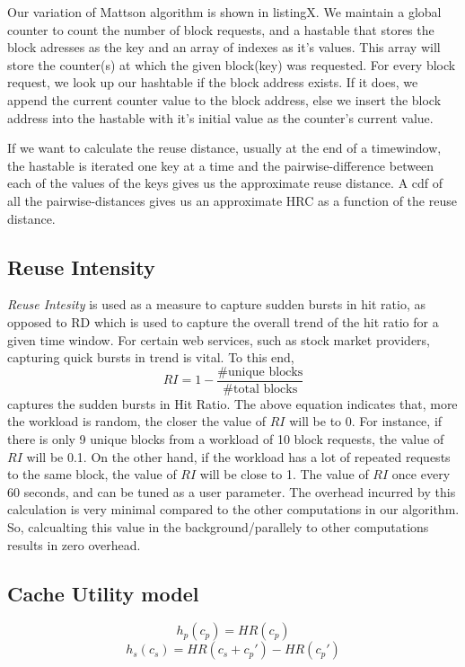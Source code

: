  Our variation of Mattson algorithm is shown in listingX. We maintain a global counter to count the number of block requests, and a hastable that stores the block adresses as the key and an array of indexes as it's values. This array will store the counter(s) at which the given block(key) was requested. For every block request, we look up our hashtable if the block address exists. If it does, we append the current counter value to the block address, else we insert the block address into the hastable with it's initial value as the counter's current value.

 If we want to calculate the reuse distance, usually at the end of a timewindow, the hastable is iterated one key at a time and the pairwise-difference between each of the values of the keys gives us the approximate reuse distance. A cdf of all the pairwise-distances gives us an approximate HRC as a function of the reuse distance. 

 \subsection{Reuse Intensity}

\emph{Reuse Intesity} is used as a measure to capture sudden bursts in hit ratio, as opposed to RD which is used to capture the overall trend of the hit ratio for a given time window. For certain web services, such as stock market providers, capturing quick bursts in trend is vital. To this end, $$ RI = 1 - \frac{\text{\# unique blocks}}{\text{\# total blocks}} $$ captures the sudden bursts in Hit Ratio. The above equation indicates that, more the workload is random, the closer the value of $RI$ will be to 0. For instance, if there is only 9 unique blocks from a workload of 10 block requests, the value of $RI$ will be 0.1. On the other hand, if the workload has a lot of repeated requests to the same block, the value of $RI$ will be close to 1. The value of $RI$ once every 60 seconds, and can be tuned as a user parameter. The overhead incurred by this calculation is very minimal compared to the other computations in our algorithm. So, calcualting this value in the background/parallely to other computations results in zero overhead. 

\subsection{Cache Utility model}


$$ h_p(c_p)  = HR(c_p) $$
$$ h_s(c_s)  = HR(c_s + c_p') - HR(c_p') $$

